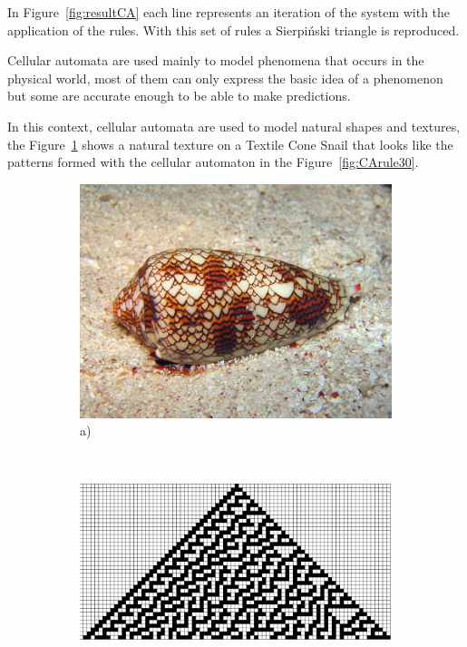 In Figure~\ref{fig:resultCA} each line represents an iteration of the system with the application of the rules. With this set of rules a Sierpiński triangle is reproduced.


Cellular automata are used mainly to model phenomena that occurs in the physical world, most of them can only express the basic idea of a phenomenon but some are accurate enough to be able to make predictions.

In this context, cellular automata are used to model natural shapes and textures, the Figure~\ref{fig:CAshell} shows a natural texture on a Textile Cone Snail that looks like the patterns formed with the cellular automaton in the Figure~\ref{fig:CArule30}.



\begin{figure}
        \centering
        \begin{subfigure}[b]{0.45\textwidth}
                \includegraphics[width=\textwidth]{img/Theory/Cellular_A/shell.jpeg}
                \caption{a)}
				\label{fig:CAshell}
        \end{subfigure}%
          ~~
        \begin{subfigure}[b]{0.45\textwidth}
                \includegraphics[width=\textwidth]{img/Theory/Cellular_A/Rule30.png}

\end{subfigure}
\end{figure}
